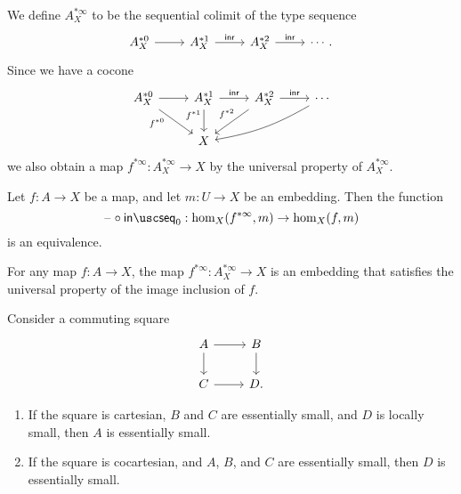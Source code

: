 \begin{defn}
We define $A_X^{\ast\infty}$ to be the sequential colimit of the type sequence
\begin{equation*}
\begin{tikzcd}
A_X^{\ast 0} \arrow[r] & A_X^{\ast 1} \arrow[r,"\inr"] & A_X^{\ast 2} \arrow[r,"\inr"] & \cdots.
\end{tikzcd}
\end{equation*}
Since we have a cocone
\begin{equation*}
\begin{tikzcd}
A_X^{\ast 0} \arrow[r] \arrow[dr,swap,"f^{\ast 0}" near start] & A_X^{\ast 1} \arrow[r,"\inr"] \arrow[d,swap,"f^{\ast 1}" near start] & A_X^{\ast 2} \arrow[r,"\inr"] \arrow[dl,swap,"f^{\ast 2}" xshift=1ex] & \cdots \arrow[dll,bend left=10] \\
& X
\end{tikzcd}
\end{equation*}
we also obtain a map $f^{\ast\infty}:A_X^{\ast\infty}\to X$ by the universal property of $A_X^{\ast\infty}$. 
\end{defn}

\begin{lem}\label{lem:finfjp_up}
Let $f:A\to X$ be a map, and let $m:U\to X$ be an embedding. Then the function
\begin{equation*}
\blank\circ \seqin_0: \mathrm{hom}_X(f^{\ast\infty},m)\to \mathrm{hom}_X(f,m)
\end{equation*}
is an equivalence. 
\end{lem}

\begin{thm}\label{lem:isprop_infjp}
For any map $f:A\to X$, the map $f^{\ast\infty}:A_X^{\ast\infty}\to X$ is an embedding that satisfies the universal property of the image inclusion of $f$.
\end{thm}

\begin{lem}
Consider a commuting square
\begin{equation*}
\begin{tikzcd}
A \arrow[r] \arrow[d] & B \arrow[d] \\
C \arrow[r] & D.
\end{tikzcd}
\end{equation*}
\begin{enumerate}
\item If the square is cartesian, $B$ and $C$ are essentially small, and $D$ is locally small, then $A$ is essentially small.
\item If the square is cocartesian, and $A$, $B$, and $C$ are essentially small, then $D$ is essentially small. 
\end{enumerate}
\end{lem}

